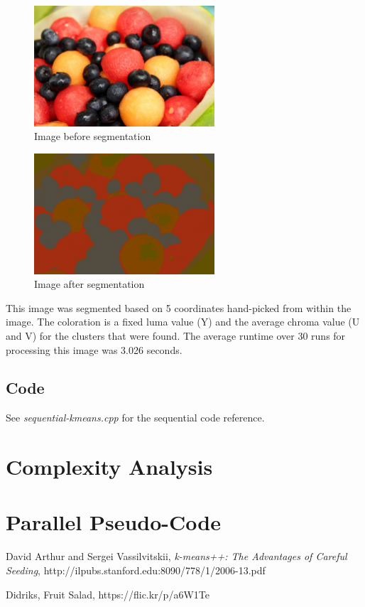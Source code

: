 \documentclass[11pt]{article}
\begin{document}
\begin{figure}
    \centering
    \includegraphics[width=0.6\textwidth]{fruit.png}
    \caption{Image\cite{fruit} before segmentation}
    \label{fig:fruit}
\end{figure}

\begin{figure}
    \centering
    \includegraphics[width=0.6\textwidth]{fruit-segmented.png}
    \caption{Image after segmentation}
    \label{fig:fruit-segmented}
\end{figure}

This image was segmented based on 5 coordinates hand-picked from within the 
image. The coloration is a fixed luma value (Y) and the average chroma value (U and V)
for the clusters that were found. The average runtime over 30 runs for processing this 
image was 3.026 seconds. 

\subsection{Code}

See \emph{sequential-kmeans.cpp} for the sequential code reference.

\section{Complexity Analysis}

\section{Parallel Pseudo-Code}

\begin{thebibliography}{9}

  David Arthur and Sergei Vassilvitskii,
  \emph{k-means++: The Advantages of Careful Seeding},
  http://ilpubs.stanford.edu:8090/778/1/2006-13.pdf

  Didriks,
  Fruit Salad,
  https://flic.kr/p/a6W1Te

\end{thebibliography}
\end{document}
